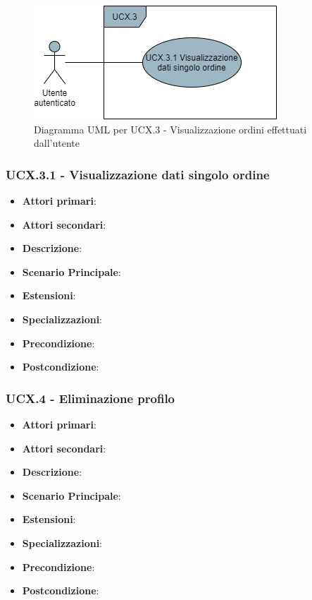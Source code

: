 \begin{figure}[H]
\centering
\includegraphics[scale=0.6]{res/UseCase/Immagini/VisualizzazioneOrdini}
\caption{Diagramma UML per UCX.3 - Visualizzazione ordini effettuati dall'utente}
\end{figure}

\subsubsection{UCX.3.1 - Visualizzazione dati singolo ordine}
\begin{itemize}
\item \textbf{Attori primari}:
\item \textbf{Attori secondari}:
\item \textbf{Descrizione}:
\item \textbf{Scenario Principale}:
\item \textbf{Estensioni}:
\item \textbf{Specializzazioni}:
\item \textbf{Precondizione}:
\item \textbf{Postcondizione}:
\end{itemize}

\subsubsection{UCX.4 - Eliminazione profilo}
\begin{itemize}
\item \textbf{Attori primari}:
\item \textbf{Attori secondari}:
\item \textbf{Descrizione}:
\item \textbf{Scenario Principale}:
\item \textbf{Estensioni}:
\item \textbf{Specializzazioni}:
\item \textbf{Precondizione}:
\item \textbf{Postcondizione}:
\end{itemize}
